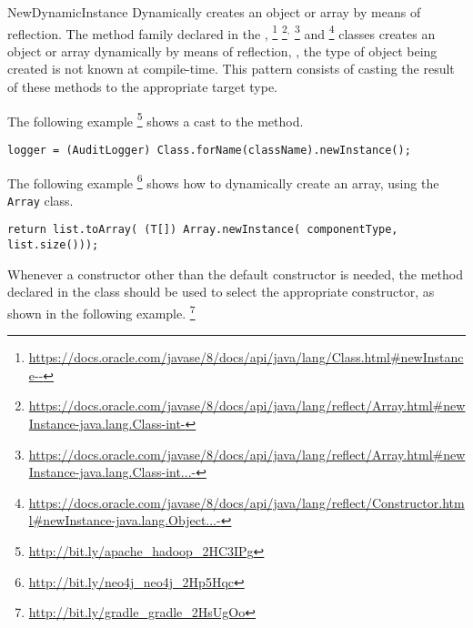 \begin{pattern}{NewDynamicInstance}
%
%
Dynamically creates an object or array by means of reflection.
The  method family declared in the ,%
\footnote{\url{https://docs.oracle.com/javase/8/docs/api/java/lang/Class.html\#newInstance--}}
\footnote{\url{https://docs.oracle.com/javase/8/docs/api/java/lang/reflect/Array.html\#newInstance-java.lang.Class-int-}}\(^{,}\)
\footnote{\url{https://docs.oracle.com/javase/8/docs/api/java/lang/reflect/Array.html\#newInstance-java.lang.Class-int...-}}
and %
\footnote{\url{https://docs.oracle.com/javase/8/docs/api/java/lang/reflect/Constructor.html\#newInstance-java.lang.Object...-}}
classes creates an object or array dynamically by means of reflection, \ie, the type of object being created is not known at compile-time.
This pattern consists of casting the result of these methods to the appropriate target type.

\instances{}
The following example%
\footnote{\url{http://bit.ly/apache_hadoop_2HC3IPg}}
shows a cast to the 
method.

\begin{verbatim}
logger = (AuditLogger) Class.forName(className).newInstance();
\end{verbatim}

The following example%
\footnote{\url{http://bit.ly/neo4j_neo4j_2Hp5Hqc}}
shows how to dynamically create an array, using the \texttt{Array} class.

\begin{verbatim}
return list.toArray( (T[]) Array.newInstance( componentType, list.size()));
\end{verbatim}

Whenever a constructor other than the default constructor is needed,
the  method declared in the  class
should be used to select the appropriate constructor,
as shown in the following example.%
\footnote{\url{http://bit.ly/gradle_gradle_2HsUgOo}}


\end{pattern}
